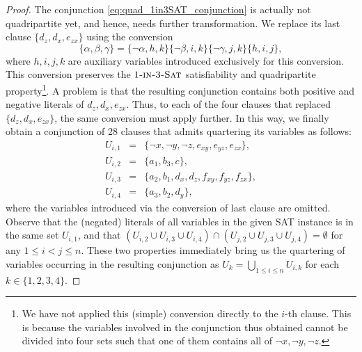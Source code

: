 \documentclass{article}
\theoremstyle{remark}
\theoremstyle{definition}
\newcommand{\SAT}{\ensuremath{\mbox{\sc Sat}}}
\newcommand{\oneinthree}{\ensuremath{\mbox{\sc 1-in-3-\SAT}}}
\begin{document}
\begin{proof}
	The conjunction \eqref{eq:quad_1in3SAT_conjunction} is actually not quadripartite yet, and hence, needs further transformation. 
	We replace its last clause $\{d_z, d_x, e_{zx}\}$ using the conversion 
	\begin{equation}\label{eq:quad_1in3SAT_conversion}
		\{\alpha, \beta, \gamma\} = \{\neg \alpha, h, k\}\{\neg \beta, i, k\}\{\neg \gamma, j, k\}\{h, i, j\}, 
	\end{equation}
	where $h, i, j, k$ are auxiliary variables introduced exclusively for this conversion. 
	This conversion preserves the $\oneinthree$ satisfiability and quadripartite property\footnote{
		We have not applied this (simple) conversion directly to the $i$-th clause. 
		This is because the variables involved in the conjunction thus obtained cannot be divided into four sets such that one of them contains all of $\neg x, \neg y, \neg z$. 
	}. 
	A problem is that the resulting conjunction contains both positive and negative literals of $d_z, d_x, e_{zx}$. 
	Thus, to each of the four clauses that replaced $\{d_z, d_x, e_{zx}\}$, the same conversion must apply further. 
	In this way, we finally obtain a conjunction of 28 clauses that admits quartering its variables as follows:  
	\begin{eqnarray*}
		U_{i,1} &=& \{\neg x, \neg y, \neg z, e_{xy}, e_{yz}, e_{zx}\}, \\
		U_{i,2} &=& \{a_1, b_3, c\}, \\
		U_{i,3} &=& \{a_2, b_1, d_x, d_z, f_{xy}, f_{yz}, f_{zx}\}, \\
		U_{i,4} &=& \{a_3, b_2, d_y\},
	\end{eqnarray*}
	where the variables introduced via the conversion of last clause are omitted. 
	Observe that the (negated) literals of all variables in the given SAT instance is in the same set $U_{i, 1}$, and that $(U_{i, 2} \cup U_{i, 3} \cup U_{i, 4}) \cap (U_{j, 2} \cup U_{j, 3} \cup U_{j, 4}) = \emptyset$ for any $1 \le i < j \le n$. 
	These two properties immediately bring us the quartering of variables occurring in the resulting conjunction as $U_k = \bigcup_{1 \le i \le n} U_{i, k}$ for each $k \in \{1, 2, 3, 4\}$. 
\end{proof}
\end{document}
